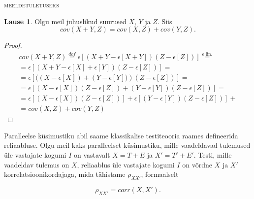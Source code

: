 \documentclass[a4paper,12pt,oneside]{article}
\newenvironment{meeldetuletus}{
	\begin{lrbox}{\thisOne}
		\begin{minipage}{0.95\textwidth} \vspace{0.25em} {\scriptsize \textsc{meeldetuletuseks}} \linebreak \vspace{-0.5em}
} 
{  
 \end{minipage}\end{lrbox}{
 		
 			\begin{mdframed}[tikzsetting={draw=black,dashed,line width=0.5pt, dash pattern = on 10pt off 3pt},%
 			linecolor=background_example,backgroundcolor=background_example,outerlinewidth=1pt]
 			\usebox{\thisOne}
 			\end{mdframed}
 		
 		
 	}
}
\numberwithin{equation}{section}
\theoremstyle{definition}
\newtheorem{summa_kovariatsioon}[equation]{Lause}
\begin{document}
\begin{meeldetuletus}
\begin{summa_kovariatsioon}
Olgu meil juhuslikud suurused $X$, $Y$ ja $Z$. Siis 
\begin{equation*}
cov(X+Y,Z) = cov(X,Z) + cov(Y,Z)  \text{.}
\end{equation*}
\end{summa_kovariatsioon}
\begin{proof}
\begin{gather*}
cov(X+Y,Z) \overset{def}{=} \epsilon \left[(X+Y - \epsilon \left[ X + Y \right])(Z - \epsilon \left[ Z \right] ) \right] \overset{\text{$\epsilon$ lin.}}{=} \\
= \epsilon \left[ (X+Y - \epsilon \left[ X \right] +  \epsilon \left[ Y \right])(Z - \epsilon \left[ Z \right]  ) \right] = \\
= \epsilon \left[ ( \left( X - \epsilon \left[ X \right] \right) +  \left( Y -\epsilon \left[ Y \right]) \right) \left(Z - \epsilon \left[ Z \right] \right)  \right] = \\
=\epsilon [  \left( X - \epsilon \left[ X \right] \right) \left( Z - \epsilon \left[ Z \right] \right) +  
 \left( Y -\epsilon \left[ Y \right] \right) \left(Z - \epsilon \left[ Z \right] \right)  ] = \\
 =\epsilon \left[  \left( X - \epsilon \left[ X \right] \right) \left( Z - \epsilon \left[ Z \right] \right) \right] +   
\epsilon \left[  \left( Y -\epsilon \left[ Y \right] \right) \left(Z - \epsilon \left[ Z \right] \right) \right] +   \\ 
 = cov(X,Z) + cov(Y,Z)
\end{gather*}
\end{proof}
\end{meeldetuletus}


Paralleelse küsimustiku abil saame klassikalise testiteooria raames defineerida reliaabluse. Olgu meil kaks paralleelset küsimustiku, mille vaadeldavad tulemused \"ule vastajate kogumi $I$ on vastavalt $X = T + E$ ja $X' = T' + E'$. Testi, mille vaadeldav tulemus on $X$,  reliaablus \"ule vastajate kogumi $I$ on võrdne $X$ ja $X'$ korrelatsioonikordajaga, mida tähistame $\rho_{XX'}$, formaalselt

\begin{equation*}
\rho_{XX'} = corr \left( X,X' \right) \text{.}
\end{equation*} 
\end{document}
